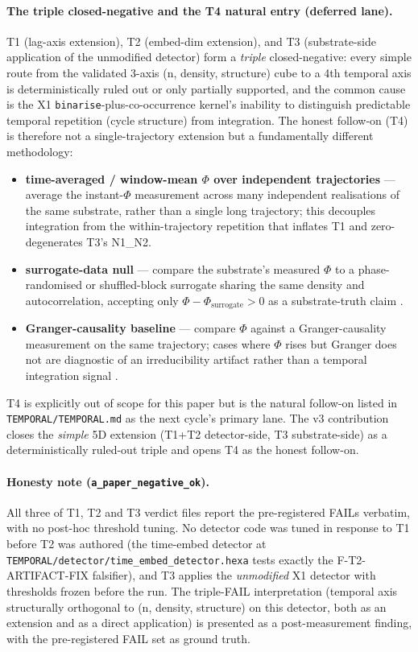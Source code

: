\documentclass[11pt,a4paper]{article}
\begin{document}
\paragraph{The triple closed-negative and the T4 natural entry (deferred lane).}
T1 (lag-axis extension), T2 (embed-dim extension), and T3
(substrate-side application of the unmodified detector) form a
\emph{triple} closed-negative: every simple route from the validated
3-axis (n, density, structure) cube to a 4th temporal axis is
deterministically ruled out or only partially supported, and the
common cause is the X1 \texttt{binarise}-plus-co-occurrence kernel's
inability to distinguish predictable temporal repetition (cycle
structure) from integration. The honest follow-on (T4) is therefore
not a single-trajectory extension but a fundamentally different
methodology:
\begin{itemize}
  \item \textbf{time-averaged / window-mean $\Phi$ over independent
    trajectories} --- average the instant-$\Phi$ measurement across
    many independent realisations of the same substrate, rather than
    a single long trajectory; this decouples integration from the
    within-trajectory repetition that inflates T1 and zero-degenerates
    T3's N1\_N2.
  \item \textbf{surrogate-data null} --- compare the substrate's
    measured $\Phi$ to a phase-randomised or shuffled-block surrogate
    sharing the same density and autocorrelation, accepting only
    $\Phi - \Phi_\text{surrogate} > 0$ as a substrate-truth claim
    \citep{schreiber2000surrogate}.
  \item \textbf{Granger-causality baseline} --- compare $\Phi$ against
    a Granger-causality measurement on the same trajectory; cases
    where $\Phi$ rises but Granger does not are diagnostic of an
    irreducibility artifact rather than a temporal integration signal
    \citep{barrett2010granger}.
\end{itemize}
T4 is explicitly out of scope for this paper but is the natural
follow-on listed in \texttt{TEMPORAL/TEMPORAL.md} as the next cycle's
primary lane. The v3 contribution closes the \emph{simple} 5D
extension (T1+T2 detector-side, T3 substrate-side) as a
deterministically ruled-out triple and opens T4 as the honest
follow-on.

\paragraph{Honesty note (\texttt{a\_paper\_negative\_ok}).}
All three of T1, T2 and T3 verdict files report the pre-registered
FAILs verbatim, with no post-hoc threshold tuning. No detector code
was tuned in response to T1 before T2 was authored (the time-embed
detector at \texttt{TEMPORAL/detector/time\_embed\_detector.hexa}
tests exactly the F-T2-ARTIFACT-FIX falsifier), and T3 applies the
\emph{unmodified} X1 detector with thresholds frozen before the run.
The triple-FAIL interpretation (temporal axis structurally orthogonal
to (n, density, structure) on this detector, both as an extension and
as a direct application) is presented as a post-measurement finding,
with the pre-registered FAIL set as ground truth.
\end{document}
